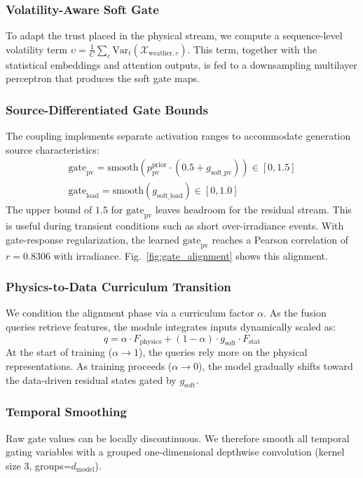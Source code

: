 \subsubsection{Volatility-Aware Soft Gate}
To adapt the trust placed in the physical stream, we compute a sequence-level volatility term $\upsilon = \frac{1}{C}\sum_{c}\text{Var}_{t}(\mathcal{X}_{\text{weather},c})$. This term, together with the statistical embeddings and attention outputs, is fed to a downsampling multilayer perceptron that produces the soft gate maps.

\subsubsection{Source-Differentiated Gate Bounds}
The coupling implements separate activation ranges to accommodate generation source characteristics:
\begin{gather}
    \text{gate}_{\text{pv}} = \text{smooth} \left( p_{\text{pv}}^{\text{prior}} \cdot (0.5 + g_{\text{soft\_pv}}) \right) \in [0, 1.5] \label{eq:gate_pv} \\
    \text{gate}_{\text{load}} = \text{smooth}(g_{\text{soft\_load}}) \in [0, 1.0] \label{eq:gate_load}
\end{gather}
The upper bound of $1.5$ for $\text{gate}_{\text{pv}}$ leaves headroom for the residual stream. This is useful during transient conditions such as short over-irradiance events. With gate-response regularization, the learned $\text{gate}_{\text{pv}}$ reaches a Pearson correlation of $r=0.8306$ with irradiance. Fig.~\ref{fig:gate_alignment} shows this alignment.

\subsubsection{Physics-to-Data Curriculum Transition}
We condition the alignment phase via a curriculum factor $\alpha$. As the fusion queries retrieve features, the module integrates inputs dynamically scaled as:
\begin{equation}
    q = \alpha \cdot F_{\text{physics}} + (1 - \alpha) \cdot g_{\text{soft}} \cdot F_{\text{stat}}
\label{eq:curriculum_query}
\end{equation}
At the start of training ($\alpha \to 1$), the queries rely more on the physical representations. As training proceeds ($\alpha \to 0$), the model gradually shifts toward the data-driven residual states gated by $g_{\text{soft}}$.

\subsubsection{Temporal Smoothing}
Raw gate values can be locally discontinuous. We therefore smooth all temporal gating variables with a grouped one-dimensional depthwise convolution (kernel size $3$, groups=$d_{\text{model}}$).

